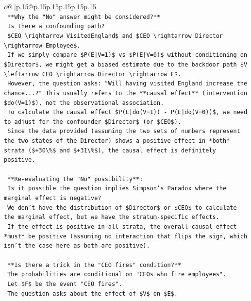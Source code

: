 \documentclass{article}
\begin{document}
{\begin{supertabular}{c@{$\;$}|p{.15\linewidth}@{}p{.15\linewidth}p{.15\linewidth}p{.15\linewidth}p{.15\linewidth}p{.15\linewidth}}
{{{\\ 
\texttt{    **Why the "No" answer might be considered?**} \\
\texttt{    Is there a confounding path?} \\
\texttt{    \$CEO \textbackslash{}rightarrow VisitedEngland\$ and \$CEO \textbackslash{}rightarrow Director \textbackslash{}rightarrow Employee\$.} \\
\texttt{    If we simply compare \$P(E|V=1)\$ vs \$P(E|V=0)\$ without conditioning on \$Director\$, we might get a biased estimate due to the backdoor path \$V \textbackslash{}leftarrow CEO \textbackslash{}rightarrow Director \textbackslash{}rightarrow E\$.} \\
\texttt{    However, the question asks: "Will having visited England increase the chance...?" This usually refers to the **causal effect** (intervention \$do(V=1)\$), not the observational association.} \\
\texttt{    To calculate the causal effect \$P(E|do(V=1)) {-} P(E|do(V=0))\$, we need to adjust for the confounder \$Director\$ (or \$CEO\$).} \\
\texttt{    Since the data provided (assuming the two sets of numbers represent the two states of the Director) shows a positive effect in *both* strata (\$+30\textbackslash{}\%\$ and \$+31\textbackslash{}\%\$), the causal effect is definitely positive.} \\
\\ 
\texttt{    **Re{-}evaluating the "No" possibility**:} \\
\texttt{    Is it possible the question implies Simpson's Paradox where the marginal effect is negative?} \\
\texttt{    We don't have the distribution of \$Director\$ or \$CEO\$ to calculate the marginal effect, but we have the stratum{-}specific effects.} \\
\texttt{    If the effect is positive in all strata, the overall causal effect *must* be positive (assuming no interaction that flips the sign, which isn't the case here as both are positive).} \\
\\ 
\texttt{    **Is there a trick in the "CEO fires" condition?**} \\
\texttt{    The probabilities are conditional on "CEOs who fire employees".} \\
\texttt{    Let \$F\$ be the event "CEO fires".} \\
\texttt{    The question asks about the effect of \$V\$ on \$E\$.} \\
}}}
\end{supertabular}}
\end{document}
